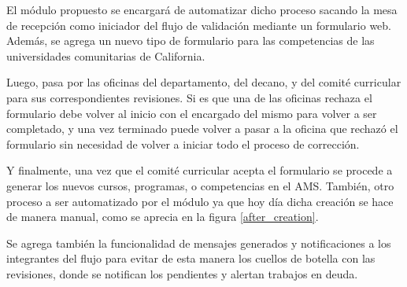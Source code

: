 El módulo propuesto se encargará de automatizar dicho proceso sacando la mesa de recepción como iniciador del flujo de validación mediante un formulario web. Además, se agrega un nuevo tipo de formulario para las competencias de las universidades comunitarias de California.

Luego, pasa por las oficinas del departamento, del decano, y del comité curricular para sus correspondientes revisiones. Si es que una de las oficinas rechaza el formulario debe volver al inicio con el encargado del mismo para volver a ser completado, y una vez terminado puede volver a pasar a la oficina que rechazó el formulario sin necesidad de volver a iniciar todo el proceso de corrección.

Y finalmente, una vez que el comité curricular acepta el formulario se procede a generar los nuevos cursos, programas, o competencias en el AMS. También, otro proceso a ser automatizado por el módulo ya que hoy día dicha creación se hace de manera manual, como se aprecia en la figura \ref{after_creation}.

Se agrega también la funcionalidad de mensajes generados y notificaciones a los integrantes del flujo para evitar de esta manera los cuellos de botella con las revisiones, donde se notifican los pendientes y alertan trabajos en deuda.



